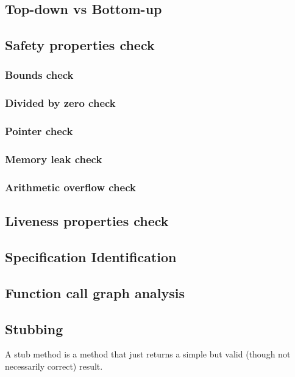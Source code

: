 \subsection{Top-down vs Bottom-up}

\subsection{Safety properties check}
\subsubsection{Bounds check}
\subsubsection{Divided by zero check}
\subsubsection{Pointer check}
\subsubsection{Memory leak check}
\subsubsection{Arithmetic overflow check}


\subsection{Liveness properties check}



\subsection{Specification Identification}

\subsection{Function call graph analysis}

\subsection{Stubbing}
A stub method is a method that just returns a simple but valid (though not necessarily correct) result.

